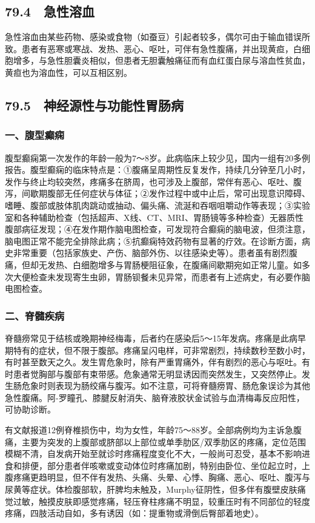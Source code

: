 \subsection{79.4　急性溶血}

急性溶血由某些药物、感染或食物（如蚕豆）引起者较多，偶尔可由于输血错误所致。患者有恶寒或寒战、发热、恶心、呕吐，可伴有急性腹痛，并出现黄疸，白细胞增多，与急性胆囊炎相似，但患者无胆囊触痛征而有血红蛋白尿与溶血性贫血，黄疸也为溶血性，可以互相区别。

\subsection{79.5　神经源性与功能性胃肠病}

\subsubsection{一、腹型癫痫}

腹型癫痫第一次发作的年龄一般为7～8岁。此病临床上较少见，国内一组有20多例报告。腹型癫痫的临床特点是：①腹痛呈周期性反复发作，持续几分钟至几小时，发作与终止均较突然，疼痛多在脐周，也可涉及上腹部，常伴有恶心、呕吐、腹泻，间歇期腹部无任何症状与体征；②发作过程中或中止后，常可出现意识障碍、嗜睡、腹部或肢体肌肉跳动或抽动、偏头痛、流涎和吞咽咀嚼动作等表现；③实验室和各种辅助检查（包括超声、X线、CT、MRI、胃肠镜等多种检查）无器质性腹部病征发现；④在发作期作脑电图检查，可发现符合癫痫的脑电波，但须注意，脑电图正常不能完全排除此病；⑤抗癫痫特效药物有显著的疗效。在诊断方面，病史非常重要（包括家族史、产伤、脑部外伤、以往感染史等）。患者虽有剧烈腹痛，但却无发热、白细胞增多与胃肠梗阻征象，在腹痛间歇期宛如正常儿童。如多次大便检查未发现寄生虫卵，胃肠钡餐未见异常，而患者有上述病史，有必要作脑电图检查。

\subsubsection{二、脊髓疾病}

脊髓痨常见于结核或晚期神经梅毒，后者约在感染后5～15年发病。疼痛是此病早期特有的症状，但不限于腹部。疼痛呈闪电样，可非常剧烈，持续数秒至数小时，有时甚至数天之久。发生胃危象时，除有严重胃痛外，伴有剧烈的恶心与呕吐。有时患者觉胸部与腹部有束带感。危象通常无明显诱因而突然发生，又突然停止。发生肠危象时则表现为肠绞痛与腹泻。如不注意，可将脊髓痨胃、肠危象误诊为其他急性腹痛。阿-罗瞳孔、膝腱反射消失、脑脊液胶状金试验与血清梅毒反应阳性，可协助诊断。

有文献报道12例脊椎损伤中，均为女性，年龄75～88岁。全部病例均为主诉急腹痛，主要为突发的上腹部或脐部以上部位或单季肋区/双季肋区的疼痛，定位范围模糊不清，自发病开始至就诊时疼痛程度变化不大，一般尚可忍受，基本不影响进食和排便，部分患者伴咳嗽或变动体位时疼痛加剧，特别由卧位、坐位起立时，上腹疼痛更趋明显，但不伴有发热、头痛、头晕、心悸、胸痛、恶心、呕吐、腹泻与尿黄等症状。体检腹部软，肝脾均未触及，Murphy征阴性，但多伴有腹壁皮肤痛觉过敏，触摸皮肤即感觉疼痛，轻压脊柱疼痛不明显，较重压时有不同部位的轻度疼痛，四肢活动自如，多有诱因（如：提重物或滑倒后臀部着地史）。

